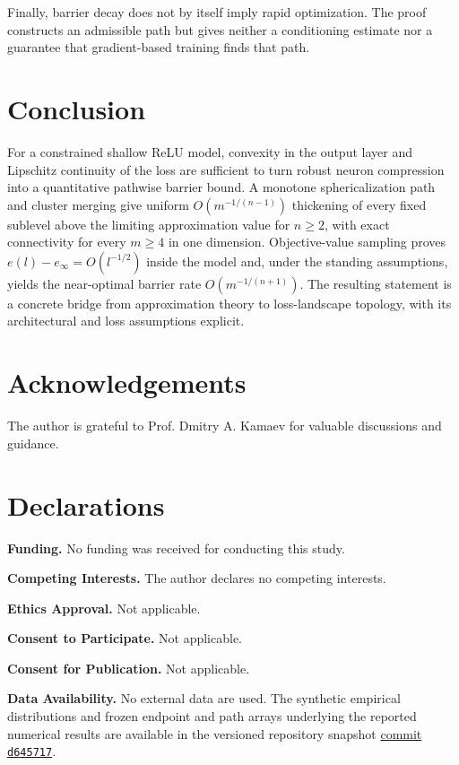\documentclass[pdflatex,sn-mathphys-num]{sn-jnl}
\theoremstyle{thmstyleone}
\theoremstyle{thmstyletwo}
\theoremstyle{thmstylethree}
\begin{document}
Finally, barrier decay does not by itself imply rapid optimization. The proof constructs an admissible path but gives neither a conditioning estimate nor a guarantee that gradient-based training finds that path.

\section{Conclusion}\label{sec:conclusion}

For a constrained shallow ReLU model, convexity in the output layer and Lipschitz continuity of the loss are sufficient to turn robust neuron compression into a quantitative pathwise barrier bound. A monotone sphericalization path and cluster merging give uniform $O(m^{-1/(n-1)})$ thickening of every fixed sublevel above the limiting approximation value for $n\ge2$, with exact connectivity for every $m\ge4$ in one dimension. Objective-value sampling proves $e(l)-e_\infty=O(l^{-1/2})$ inside the model and, under the standing assumptions, yields the near-optimal barrier rate $O(m^{-1/(n+1)})$. The resulting statement is a concrete bridge from approximation theory to loss-landscape topology, with its architectural and loss assumptions explicit.

\backmatter

\section*{Acknowledgements}
The author is grateful to Prof. Dmitry A. Kamaev for valuable discussions and guidance.

\section*{Declarations}

\textbf{Funding.} No funding was received for conducting this study.

\textbf{Competing Interests.} The author declares no competing interests.

\textbf{Ethics Approval.} Not applicable.

\textbf{Consent to Participate.} Not applicable.

\textbf{Consent for Publication.} Not applicable.

\textbf{Data Availability.} No external data are used. The synthetic empirical distributions and frozen endpoint and path arrays underlying the reported numerical results are available in the versioned repository snapshot \href{https://github.com/Safreliy/energy-gap-estimate/tree/d645717a7f82658d913703700549e609c79b0b25}{commit \texttt{d645717}}.
\end{document}
